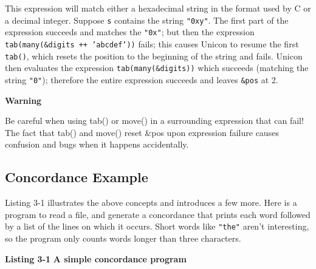 
This expression will match either a hexadecimal string in the format
used by C or a decimal integer. Suppose \texttt{s} contains the string
\texttt{"0xy"}. The first part of the
expression succeeds and matches the
\texttt{"0x"}; but then the expression
\texttt{tab(many(\&digits ++
'abcdef'))} fails; this causes Unicon
to resume the first \texttt{tab()}, which resets the position to the
beginning of the string and fails. Unicon then evaluates the expression
\texttt{tab(many(\&digits))} which succeeds (matching the string
\texttt{"0"}); therefore the entire
expression succeeds and leaves \texttt{\&pos} at 2.

{\sffamily\bfseries
Warning}

{\sffamily
Be careful when using tab() or move() in a surrounding expression that
can fail! The fact that tab() and move() reset \&pos upon expression
failure causes confusion and bugs when it happens accidentally.}

\subsection{Concordance Example}

Listing 3-1 illustrates the above concepts and introduces a few more.
Here is a program to read a file, and generate a
concordance that prints each word followed by a list
of the lines on which it occurs. Short words like
\texttt{"the"} aren't
interesting, so the program only counts words longer than three
characters. 

\bigskip

{\sffamily\bfseries Listing 3-1}
{\sffamily\bfseries A simple concordance program}

